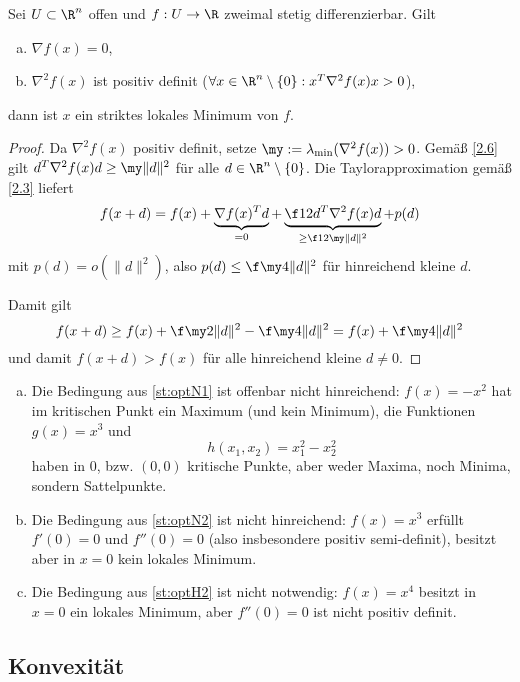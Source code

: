 \begin{st} \label{2.12} \label{st:optH2}
	Sei $U \subset \R^n$ offen und $f: U \to \R$ zweimal stetig differenzierbar.
	Gilt
	\begin{enumerate}[(a)]
		\item
			$\nabla f(x) = 0$,
		\item
			$\nabla^2 f(x)$ ist positiv definit ($\forall x \in \R^n \setminus \{0\} : x^T \nabla^2 f(x) x > 0$),
	\end{enumerate}
	dann ist $x$ ein striktes lokales Minimum von $f$.
	\begin{proof}
		Da $\nabla^2 f(x)$ positiv definit, setze $\my := \lambda_{\text{min}} (\nabla^2 f(x)) > 0$.
		Gemäß \ref{2.6} gilt $d^T \nabla^2 f(x) d \ge \my \|d\|^2$ für alle $d \in \R^n \setminus \{0\}$.
		Die Taylorapproximation gemäß \ref{2.3} liefert
		\[
			f(x+d)
			= f(x) + \underbrace{\nabla f(x)^T d}_{=0} + \underbrace{\f 12 d^T \nabla^2 f(x) d}_{\ge \f 12 \my \|d\|^2} + p(d)
		\]
		mit $p(d) = o(\|d\|^2)$, also $p(d) \le \f \my 4 \|d\|^2$ für hinreichend kleine $d$.

		Damit gilt
		\[
			f(x+d)
			\ge f(x) + \f \my2 \|d\|^2 - \f \my4 \|d\|^2
			= f(x) + \f \my4 \|d\|^2
		\]
		und damit $f(x+d) > f(x)$ für alle hinreichend kleine $d \neq 0$.
	\end{proof}
\end{st}

\begin{ex} \label{2.13}
	\begin{enumerate}[(a)]
		\item
			Die Bedingung aus \ref{st:optN1} ist offenbar nicht hinreichend:
			$f(x) = -x^2$ hat im kritischen Punkt ein Maximum (und kein Minimum),
			die Funktionen $g(x) = x^3$ und
			\[
				h(x_1,x_2) = x_1^2 - x_2^2
			\]
			haben in $0$, bzw. $(0,0)$ kritische Punkte, aber weder Maxima, noch Minima, sondern Sattelpunkte.
		\item
			Die Bedingung aus \ref{st:optN2} ist nicht hinreichend:
			$f(x) = x^3$ erfüllt $f'(0) = 0$ und $f''(0) = 0$ (also insbesondere positiv semi-definit), besitzt aber in $x = 0$ kein lokales Minimum.
		\item
			Die Bedingung aus \ref{st:optH2} ist nicht notwendig:
			$f(x) = x^4$ besitzt in $x = 0$ ein lokales Minimum, aber $f''(0) = 0$ ist nicht positiv definit.
	\end{enumerate}
\end{ex}


\subsection{Konvexität}


